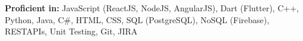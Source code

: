 \textbf{Proficient in:} JavaScript (ReactJS, NodeJS, AngularJS), Dart (Flutter), C++, Python, Java, C\#, HTML, CSS, SQL (PostgreSQL), NoSQL (Firebase), RESTAPIs, Unit Testing, Git, JIRA
